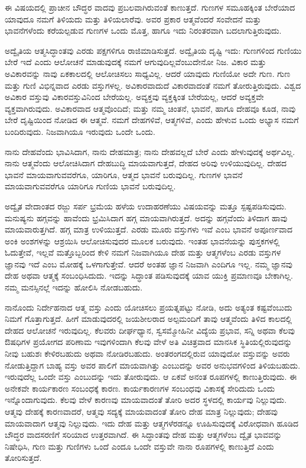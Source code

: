 \vskip 0.2cm

ಈ ವಿಷಯದಲ್ಲಿ ಪ್ರಾಚೀನ ಬೌದ್ಧರ ವಾದವು ಪ್ರಬಲವಾಗಿರುವಂತೆ ಕಾಣುತ್ತದೆ. ಗುಣಗಳ ಸಮೂಹಕ್ಕಿಂತ ಬೇರೆಯಾದ ಯಾವುದೂ ನಮಗೆ ತಿಳಿಯದು ಮತ್ತು ತಿಳಿಯಲಾರೆವು. ಅವರ ಪ್ರಕಾರ ಆತ್ಮವೆಂದರೆ ಸಂವೇದನೆ ಮತ್ತು ಭಾವನೆಗಳೆಂದು ಕರೆಯಲ್ಪಡುವ ಗುಣಗಳ ಒಂದು ಮೊತ್ತ, ಹಾಗೂ ಇದು ನಿರಂತರವಾಗಿ ಬದಲಾಗುತ್ತಿರುವುದು. 

\vskip 0.2cm

ಅದ್ವೈತಿಯ ಆತ್ಮಸಿದ್ಧಾಂತವು ಎರಡು ಪಕ್ಷಗಳಿಗೂ ರಾಜಿಮಾಡಿಸುತ್ತದೆ. ಅದ್ವೈತಿಯ ದೃಷ್ಟಿ ಇದು: ಗುಣಗಳಿಂದ ಗುಣಿಯು ಬೇರೆ ಇದೆ ಎಂದು ಆಲೋಚನೆ ಮಾಡುವುದಕ್ಕೆ ನಮಗೆ ಆಗುವುದಿಲ್ಲವೆಂಬುದೇನೋ ನಿಜ. ವಿಕಾರ ಮತ್ತು ಅವಿಕಾರವನ್ನು ನಾವು ಏಕಕಾಲದಲ್ಲಿ ಆಲೋಚಿಸಲು ಸಾಧ್ಯವಿಲ್ಲ. ಆದರೆ ಯಾವುದು ಗುಣಿಯೋ ಅದೇ ಗುಣ. ಗುಣ ಮತ್ತು ಗುಣಿ ವಿಭಿನ್ನವಾದ ಎರಡು ವಸ್ತುಗಳಲ್ಲ. ಅವಿಕಾರವಾದುದೆ ವಿಕಾರವಾದಂತೆ ನಮಗೆ ತೋರುತ್ತಿರುವುದು. ವಿಶ್ವದ ಅವಿಕಾರ ವಸ್ತುವು ವಿಕಾರವಸ್ತುವಿನಿಂದ ಬೇರೆಯಲ್ಲ. ಅವ್ಯಕ್ತವು ವ್ಯಕ್ತಕ್ಕಿಂತ ಬೇರೆಯಲ್ಲ, ಆದರೆ ಅವ್ಯಕ್ತವೇ ವ್ಯಕ್ತವಾಗಿರುವುದು. ಅವಿಕಾರವಾದ ಆತ್ಮವೊಂದಿದೆ; ಮತ್ತು ನಮ್ಮ ಚಿಂತನೆ, ಭಾವನೆ, ಹಾಗೂ ದೇಹವೂ ಕೂಡ, ನಾವು ಬೇರೆ ದೃಷ್ಟಿಯಿಂದ ನೋಡಿದ ಈ ಆತ್ಮವೆ. ನಮಗೆ ದೇಹಗಳಿವೆ, ಆತ್ಮಗಳಿವೆ, ಎಂದು ಹೇಳುವ ಒಂದು ಅಭ್ಯಾಸ ನಮಗೆ ಬಂದಿರುವುದು. ನಿಜವಾಗಿಯೂ ಇರುವುದು ಒಂದೇ ಒಂದು. 

\vskip 0.2cm

ನಾನು ದೇಹವೆಂದು ಭಾವಿಸಿದಾಗ, ನಾನು ದೇಹಮಾತ್ರ; ನಾನು ದೇಹವಲ್ಲದೆ ಬೇರೆ ಎಂದು ಹೇಳುವುದಕ್ಕೆ ಅರ್ಥವಿಲ್ಲ. ನಾನು ಆತ್ಮವೆಂದು ಆಲೋಚಿಸಿದಾಗ ದೇಹಬುದ್ಧಿ ಮಾಯವಾಗುತ್ತದೆ, ದೇಹದ ಅರಿವು ಉಳಿಯುವುದಿಲ್ಲ. ದೇಹದ ಭಾವನೆ ಮಾಯವಾಗುವವರೆಗೂ, ಯಾರಿಗೂ, ಆತ್ಮದ ಭಾವನೆ ಬರುವುದಿಲ್ಲ. ಗುಣಗಳ ಭಾವನೆ ಮಾಯವಾಗುವವರೆಗೂ ಯಾರಿಗೂ ಗುಣಿಯ ಭಾವನೆ ಬರುವುದಿಲ್ಲ. 

\vskip 0.2cm

ಅದ್ವೈತ ವೇದಾಂತದ ರಜ್ಜು ಸರ್ಪ ಭ್ರಮೆಯ ಹಳೆಯ ಉದಾಹರಣೆಯು ವಿಷಯವನ್ನು ಮತ್ತೂ ಸ್ಪಷ್ಟಪಡಿಸುವುದು. ಮನುಷ್ಯನು ಹಗ್ಗವನ್ನು ಹಾವೆಂದು ಭ್ರಮಿಸಿದಾಗ ಹಗ್ಗ ಮಾಯವಾಗಿರುತ್ತದೆ. ಅದನ್ನು ಹಗ್ಗವೆಂದು ತಿಳಿದಾಗ ಹಾವು ಮಾಯವಾರುತ್ತಗಿದೆ. ಹಗ್ಗ ಮಾತ್ರ ಉಳಿಯುತ್ತದೆ. ಎರಡು ಮೂರು ವಸ್ತುಗಳು ಇವೆ ಎಂಬ ಭಾವನೆ ಅಪೂರ್ಣವಾದ ಅಂಕಿ ಅಂಶಗಳನ್ನು ಆಶ್ರಯಿಸಿ ಆಲೋಚಿಸುವುದರ ಮೂಲಕ ಬರುವುದು. ಇಂತಹ ಭಾವನೆಯನ್ನು ಪುಸ್ತಕಗಳಲ್ಲಿ ಓದುತ್ತೇವೆ, ಇಲ್ಲವೆ ಮತ್ತೊಬ್ಬರಿಂದ ಕೇಳಿ ನಮಗೆ ನಿಜವಾಗಿಯೂ ದೇಹ ಮತ್ತು ಆತ್ಮಗಳೆಂಬ ಎರಡು ವಸ್ತುಗಳ ಜ್ಞಾನವು ಇದೆ ಎಂಬ ಮೋಹಕ್ಕೆ ಒಳಗಾಗುತ್ತೇವೆ. ಆದರೆ ಅಂತಹ ಜ್ಞಾನ ನಿಜವಾಗಿ ಎಂದಿಗೂ ಇಲ್ಲ. ನಮ್ಮ ಜ್ಞಾನವು ದೇಹ ಅಥವಾ ಆತ್ಮಕ್ಕೆ ಸಂಬಂಧಿಸಿದುದು. ಇದನ್ನು ಸಿದ್ಧಾಂತ ಪಡಿಸುವುದಕ್ಕೆ ಯಾವ ಯುಕ್ತಿ ಪ್ರಮಾಣವೂ ಬೇಕಾಗಿಲ್ಲ. ನಮ್ಮ ಮನಸ್ಸಿನಲ್ಲೆ ಇದನ್ನು ಹೋಲಿಸಿ ನೋಡಬಹುದು. 

\vskip 0.2cm

ನಾನೊಂದು ನಿರ್ದೇಹನಾದ ಆತ್ಮ ವಸ್ತು ಎಂದು ಯೋಚಿಸಲು ಪ್ರಯತ್ನಪಟ್ಟು ನೋಡಿ, ಅದು ಅತ್ಯಂತ ಕಷ್ಟವೆಂಬುದು ನಿಮಗೆ ಗೊತ್ತಾಗುತ್ತದೆ. ಹೀಗೆ ಮಾಡುವುದರಲ್ಲಿ ಜಯಶೀಲರಾದ ಅಲ್ಪಮಂದಿಗೆ ತಾವು ಆತ್ಮವೆಂದು ತಿಳಿದ ಕಾಲದಲ್ಲಿ ದೇಹದ ಆಲೋಚನೆ ಇರುವುದಿಲ್ಲ. ಕೆಲವರು ದೀರ್ಘಧ್ಯಾನ, ಸ್ವಸಮ್ಮೋಹಿನೀ ವಿದ್ಯೆಯ ಪ್ರಭಾವ, ಸನ್ನಿ ಅಥವಾ ಕೆಲವು ಔಷಧಿಗಳ ಪ್ರಯೋಗದ ಪರಿಣಾಮ ಇವುಗಳಿಂದಾಗಿ ಕೆಲವು ವೇಳೆ ಅತಿ ವಿಚಿತ್ರವಾದ ಮಾನಸಿಕ ಸ್ಥಿತಿಯಲ್ಲಿರುವುದನ್ನು ನೀವು ಬಹುಶಃ ಕೇಳಿರಬಹುದು ಅಥವಾ ನೋಡಿರಬಹುದು. ಅಂತರಂಗದಲ್ಲಿರುವ ಯಾವುದೋ ವಸ್ತುವನ್ನು ಅವರು ನೋಡುತ್ತಿದ್ದಾಗ ಬಾಹ್ಯ ವಸ್ತು ಅವರ ಪಾಲಿಗೆ ಮಾಯವಾಗಿತ್ತು ಎಂಬುದನ್ನು ಅವರ ಅನುಭವಗಳಿಂದ ತಿಳಿಯಬಹುದು. ಇರುವುದೆಲ್ಲ ಒಂದೇ ವಸ್ತು ಎಂಬುದನ್ನು ಇದು ತೋರುವುದು. ಆ ಏಕವೆ ಅನಂತ ರೂಪಗಳಲ್ಲಿ ಕಾಣುತ್ತಿರುವುದು. ಈ ಅನೇಕವೇ ಕಾರ್ಯಕಾರಣ ಸಂಬಂಧಕ್ಕೆ ಕಾರಣ. ಕಾರ್ಯಕಾರಣಗಳ ಸಂಬಂಧವು ವಿಕಾಸಕ್ಕೆ ಸೇರಿದುದು ಒಂದು ಇನ್ನೊಂದಾಗುವುದು. ಕೆಲವು ವೇಳೆ ಕಾರಣವು ಮಾಯವಾದಂತೆ ತೋರಿ ಅದರ ಸ್ಥಳದಲ್ಲಿ ಕಾರ್ಯವು ನಿಲ್ಲುವುದು. ಆತ್ಮವು ದೇಹಕ್ಕೆ ಕಾರಣವಾದರೆ, ಆತ್ಮವು ಸದ್ಯಕ್ಕೆ ಮಾಯವಾದಂತೆ ತೋರಿ ದೇಹ ಮಾತ್ರ ನಿಲ್ಲುವುದು; ದೇಹವು ಮಾಯವಾದಾಗ ಆತ್ಮವು ನಿಲ್ಲುವುದು. ಇದು ದೇಹ ಮತ್ತು ಆತ್ಮಗಳೆರಡನ್ನೂ ಊಹಿಸುವುದಕ್ಕೆ ವಿರೋಧವಾಗಿ ಹೂಡಿದ ಬೌದ್ಧರ ವಾದಸರಣಿಗೆ ಸರಿಯಾದ ಉತ್ತರವಾಗಿದೆ. ಈ ಸಿದ್ಧಾಂತವು ದೇಹ ಮತ್ತು ಆತ್ಮಗಳೆಂಬ ದ್ವೈತ ಭಾವವನ್ನು ನಿಷೇಧಿಸಿ, ಗುಣ ಮತ್ತು ಗುಣಿಗಳು ಒಂದೆ ಎಂದೂ ಒಂದೇ ವಸ್ತುವೇ ನಾನಾ ರೂಪಗಳಲ್ಲಿ ಕಾಣುತ್ತಿದೆ ಎಂದು ತೋರಿಸುತ್ತದೆ. 

